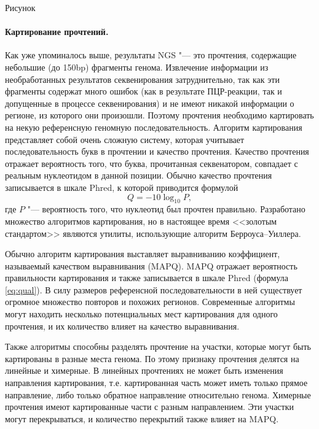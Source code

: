 \documentclass[a4paper,12pt]{article}
\begin{document}
\begin{Huge}Рисунок\end{Huge}

\paragraph{Картирование прочтений.}
Как уже упоминалось выше, результаты NGS "--- это прочтения, содержащие небольшие (до 150bp) фрагменты генома.
Извлечение информации из необработанных результатов секвенирования затруднительно, так как эти фрагменты содержат много ошибок (как в результате ПЦР-реакции, так и допущенные в процессе секвенирования) и не имеют никакой информации о регионе, из которого они произошли.
Поэтому прочтения необходимо картировать на некую референсную геномную последовательность.
Алгоритм картирования представляет собой очень сложную систему, которая учитывает последовательность букв в прочтении и качество прочтения.
Качество прочтения отражает вероятность того, что буква, прочитанная секвенатором, совпадает с реальным нуклеотидом в данной позиции.
Обычно качество прочтения записывается в шкале Phred, к которой приводится формулой \begin{equation}Q = -10\log_{10}P,\label{eq:qual}\end{equation} где $P$ "--- вероятность того, что нуклеотид был прочтен правильно.
Разработано множество алгоритмов картирования, но в настоящее время <<золотым стандартом>> являются утилиты, использующие алгоритм Берроуса--Уиллера\cite{Burrows_1994}.

Обычно алгоритм картирования выставляет выравниванию коэффициент, называемый качеством выравнивания (MAPQ).
MAPQ отражает вероятность правильности картирования и также записывается в шкале Phred (формула \ref{eq:qual}).
В силу размеров референсной последовательности в ней существует огромное множество повторов и похожих регионов.
Современные алгоритмы могут находить несколько потенциальных мест картирования для одного прочтения, и их количество влияет на качество выравнивания.

Также алгоритмы способны разделять прочтение на участки, которые могут быть картированы в разные места генома.
По этому признаку прочтения делятся на линейные и химерные.
В линейных прочтениях не может быть изменения направления картирования, т.е. картированная часть может иметь только прямое направление, либо только обратное направление относительно генома.
Химерные прочтения имеют картированные части с разным направлением.
Эти участки могут перекрываться, и количество перекрытий также влияет на MAPQ.
\end{document}
